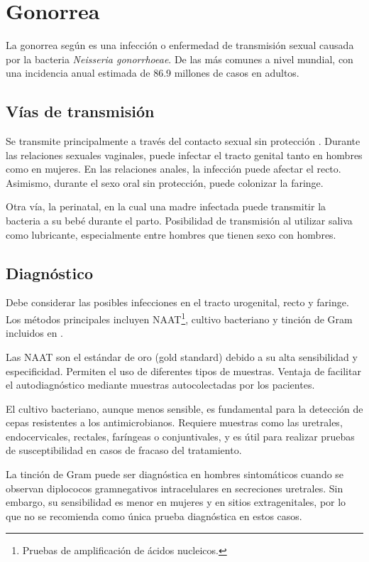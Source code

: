 \section{Gonorrea}
La gonorrea según \cite{unemo2019gonorrhoea} es una infección o enfermedad de transmisión sexual causada por la bacteria \textit{Neisseria gonorrhoeae}. De las más comunes a nivel mundial, con una incidencia anual estimada de 86.9 millones de casos en adultos.


\subsection{Vías de transmisión}
Se transmite principalmente a través del contacto sexual sin protección \cite{workowski2021sexually}. Durante las relaciones sexuales vaginales, puede infectar el tracto genital tanto en hombres como en mujeres. En las relaciones anales, la infección puede afectar el recto. Asimismo, durante el sexo oral sin protección, puede colonizar la faringe.

Otra vía, la perinatal, en la cual una madre infectada puede transmitir la bacteria a su bebé durante el parto. Posibilidad de transmisión al utilizar saliva como lubricante, especialmente entre hombres que tienen sexo con hombres. 

\subsection{Diagnóstico}
Debe considerar las posibles infecciones en el tracto urogenital, recto y faringe. Los métodos principales incluyen  NAAT\footnote{Pruebas de amplificación de ácidos nucleicos.}, cultivo bacteriano y tinción de Gram incluidos en \cite{adamson2022diagnostic}.

Las NAAT son el estándar de oro (gold standard) debido a su alta sensibilidad y especificidad. Permiten el uso de diferentes tipos de muestras. Ventaja de facilitar el autodiagnóstico mediante muestras autocolectadas por los pacientes.

El cultivo bacteriano, aunque menos sensible, es fundamental para la detección de cepas resistentes a los antimicrobianos. Requiere muestras como las uretrales, endocervicales, rectales, faríngeas o conjuntivales, y es útil para realizar pruebas de susceptibilidad en casos de fracaso del tratamiento.

La tinción de Gram puede ser diagnóstica en hombres sintomáticos cuando se observan diplococos gramnegativos intracelulares en secreciones uretrales. Sin embargo, su sensibilidad es menor en mujeres y en sitios extragenitales, por lo que no se recomienda como única prueba diagnóstica en estos casos.

